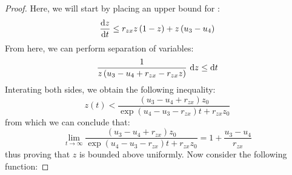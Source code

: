 \begin{proof}
    Here, we will start by placing an upper bound for :
    \begin{equation*}
        \diff[]{z}{t} \leq r_{zx}z\left(1-z\right)+z\left(u_3-u_4\right)
    \end{equation*}
    From here, we can perform separation of variables:\
    \begin{equation*}
        \frac{1}{z\left(u_3-u_4+r_{zx}-r_{zx}z\right)}\ \opdiff{z} \leq \opdiff{t}
    \end{equation*}
    Interating both sides, we obtain the following inequality:
    \begin{equation*}
        z(t) < \frac{\left(u_3-u_4+r_{zx}\right)z_0}{\exp{\left(u_4-u_3-r_{zx}\right)t}+r_{zx}z_0}
    \end{equation*}
    from which we can conclude that:
    \begin{equation*}
        \lim_{t\to\infty} \frac{\left(u_3-u_4+r_{zx}\right)z_0}{\exp{\left(u_4-u_3-r_{zx}\right)t}+r_{zx}z_0} = 1+\frac{u_3-u_4}{r_{zx}}
    \end{equation*}
    thus proving that $z$ is bounded above uniformly. Now consider the following function:

\end{proof}
